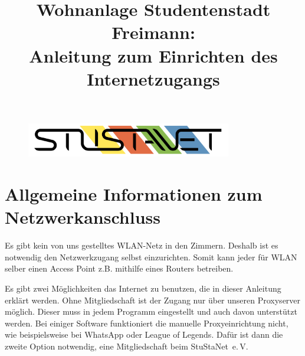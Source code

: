 \documentclass[a4paper,12pt]{scrartcl}
\title{Wohnanlage Studentenstadt Freimann:\\
       Anleitung zum Einrichten des Internetzugangs}
\makeatletter
\newcommand{\StuStaNet}{StuStaNet~e.\,V.\@}
\makeatother
\begin{document}
\maketitle

\begin{figure}[t!]
   \centering
   \vspace{-20pt}
   \includegraphics[width=0.8\textwidth,keepaspectratio]{Bilder/StuStaNet_Logo}
   \vspace{-40pt}
\end{figure}

\section{Allgemeine Informationen zum Netzwerkanschluss}

Es gibt kein von uns gestelltes WLAN-Netz in den Zimmern.
Deshalb ist es notwendig den Netzwerkzugang selbst einzurichten.
Somit kann jeder für WLAN selber einen Access Point z.B. mithilfe eines Routers betreiben.

Es gibt zwei Möglichkeiten das Internet zu benutzen, die in dieser Anleitung erklärt werden.
Ohne Mitgliedschaft ist der Zugang nur über unseren Proxyserver möglich.
Dieser muss in jedem Programm eingestellt und auch davon unterstützt werden.
Bei einiger Software funktioniert die manuelle Proxyeinrichtung nicht, wie beispielsweise bei WhatsApp oder League of Legends.
Dafür ist dann die zweite Option notwendig, eine Mitgliedschaft beim \StuStaNet{}
\end{document}
